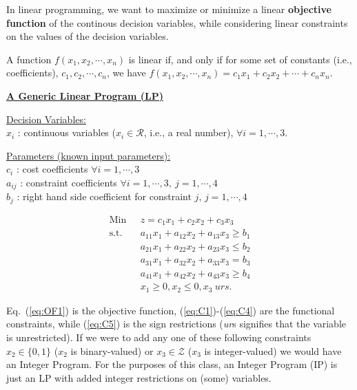 %


\medskip  In linear programming, we want to maximize or minimize a linear {\bf objective function} of the continous decision variables, while considering linear constraints on the values of the decision variables.

 A function $f(x_1,x_2,\cdots,x_n)$ is linear if, and only if for some set of constants (i.e., coefficients), $c_1,c_2,\cdots,c_n$, we have $f(x_1,x_2,\cdots,x_n) = c_1x_1 + c_2x_2 + \cdots + c_nx_n$.

\bigskip  \underline{\bf A Generic Linear Program (LP)}

\medskip  \underline{Decision Variables:}\\
$x_i$ : continuous variables ($x_i \in \mathcal{R}$, i.e., a real number), $\forall i = 1,\cdots,3$.

\medskip \underline{Parameters (known input parameters):}\\
$c_i$ : cost coefficients $\forall i = 1,\cdots,3$ \\
$a_{ij}$ : constraint coefficients $\forall i = 1,\cdots,3,~ j = 1,\cdots,4$ \\
$b_j$ : right hand side coefficient for constraint $j$, $j = 1,\cdots,4$

\begin{align}
\mbox{Min~~} & z = c_1x_1 + c_2x_2 + c_3x_3  \label{eq:OF1}\\
\mbox{s.t.~~} & a_{11}x_1 + a_{12}x_2 + a_{13} x_3 \ge b_1 \label{eq:C1} \\
& a_{21}x_1 + a_{22}x_2 + a_{23} x_3 \le b_2 \label{eq:C2} \\
& a_{31}x_1 + a_{32}x_2 + a_{33} x_3 = b_3 \label{eq:C3}\\
& a_{41}x_1 + a_{42}x_2 + a_{43} x_3 \ge b_4 \label{eq:C4}\\
& x_1 \ge 0, x_2 \le 0, x_3~urs \label{eq:C5}.
\end{align}

Eq.~(\ref{eq:OF1}) is the objective function, (\ref{eq:C1})-(\ref{eq:C4}) are the functional constraints, while (\ref{eq:C5}) is the sign restrictions ({\it ur}s signifies that the variable is unrestricted). If we were to add any one of these following constraints $x_2 \in \{0, 1\}$ ($x_2$ is binary-valued) or $x_3 \in \mathcal{Z}$ ($x_3$ is integer-valued) we would have an Integer Program.  For the purposes of this class, an Integer Program (IP) is just an LP with added integer restrictions on (some) variables.

